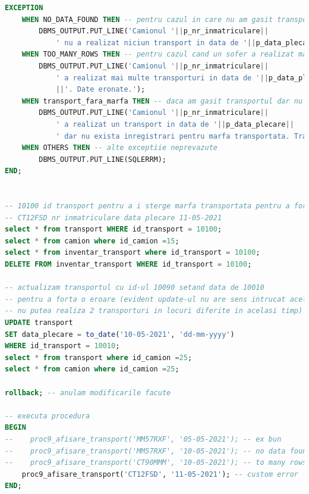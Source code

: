 \documentclass[12pt, a4paper]{article}
\begin{document}
\begin{lstlisting}[language=SQL]
EXCEPTION
    WHEN NO_DATA_FOUND THEN -- pentru cazul in care nu am gasit transportul
        DBMS_OUTPUT.PUT_LINE('Camionul '||p_nr_inmatriculare||
            ' nu a realizat niciun transport in data de '||p_data_plecare);
    WHEN TOO_MANY_ROWS THEN -- pentru cazul cand un sofer a realizat mai multe transporturi intr-o zi
        DBMS_OUTPUT.PUT_LINE('Camionul '||p_nr_inmatriculare||
            ' a realizat mai multe transporturi in data de '||p_data_plecare
            ||'. Date eronate.');
    WHEN transport_fara_marfa THEN -- daca am gasit transportul dar nu si marfa
        DBMS_OUTPUT.PUT_LINE('Camionul '||p_nr_inmatriculare||
            ' a realizat un transport in data de '||p_data_plecare||
            ' dar nu exista inregistrari pentru marfa transportata. Transport invalid.');
    WHEN OTHERS THEN -- alte exceptiie neprevazute
        DBMS_OUTPUT.PUT_LINE(SQLERRM);
END;


-- 10100 id transport pentru a i sterge marfa transportata pentru a forta o eroare
-- CT12FSD nr inmatriculare data plecare 11-05-2021
select * from transport WHERE id_transport = 10100;
select * from camion where id_camion =15;
select * from inventar_transport where id_transport = 10100;
DELETE FROM inventar_transport WHERE id_transport = 10100;

-- actualizam transportul cu id-ul 10090 setand data de 10010
-- pentru a forta o eroare (evident update-ul nu are sens intrucat acelasi camion
-- nu putea realiza 2 transporturi in locuri diferite in acelasi timp)
UPDATE transport
SET data_plecare = to_date('10-05-2021', 'dd-mm-yyyy')
WHERE id_transport = 10010;
select * from transport where id_camion =25;
select * from camion where id_camion =25;

rollback; -- anulam modificarile facute

-- executa procedura
BEGIN
--    proc9_afisare_transport('MM57RXF', '05-05-2021'); -- ex bun
--    proc9_afisare_transport('MM57RXF', '10-05-2021'); -- no data found - nu am gasit transportul
--    proc9_afisare_transport('CT90MMM', '10-05-2021'); -- to many rows - am gasit mai multe transporturi
    proc9_afisare_transport('CT12FSD', '11-05-2021'); -- custom error - am gasit tarnsportul dar nu si marfa
END;
\end{lstlisting}
\end{document}

